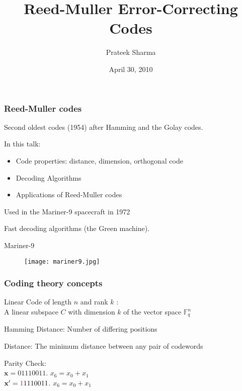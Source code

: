 \documentclass[xcolor=xvgnames]{beamer}
\title{Reed-Muller Error-Correcting Codes}
\author{Prateek Sharma}
\date{April 30, 2010}
\newcommand{\rem}{Reed-Muller}
\newcommand{\V}[1]{\ensuremath{\mathbf{#1}}}
\begin{document}
\maketitle



\begin{frame}
 \frametitle{Reed-Muller codes}
Second oldest codes (1954) after Hamming and the Golay codes.

In this talk: \\
\begin{itemize}
\item Code properties: distance, dimension, orthogonal code 
\item Decoding Algorithms 
\item Applications of \rem{} codes 
\end{itemize}

Used in the \alert{Mariner-9 spacecraft} in 1972 

Fast decoding algorithms (the Green machine).

\end{frame}



\begin{frame}{Mariner-9}
\begin{figure}
   \texttt{[image: mariner9.jpg]}
\end{figure}
\end{frame}


\begin{frame}
 \frametitle{Coding theory concepts}
\alert{Linear Code} of length $n$ and rank $k$ : \\
A linear subspace $C$ with dimension $k$ of the vector space $\mathbb{F}_q^n$ 

\alert{Hamming Distance: } Number of differing positions

\alert{Distance: } The minimum distance between any pair of codewords

\alert{Parity Check: } \\
 $\V{x} = 01110011$. $x_6 = x_0 + x_1 $ \\
 $\V{x'}= \textcolor{red}{1}1110011$. $x_6 = x_0 + x_1 $

\end{frame}
\end{document}
